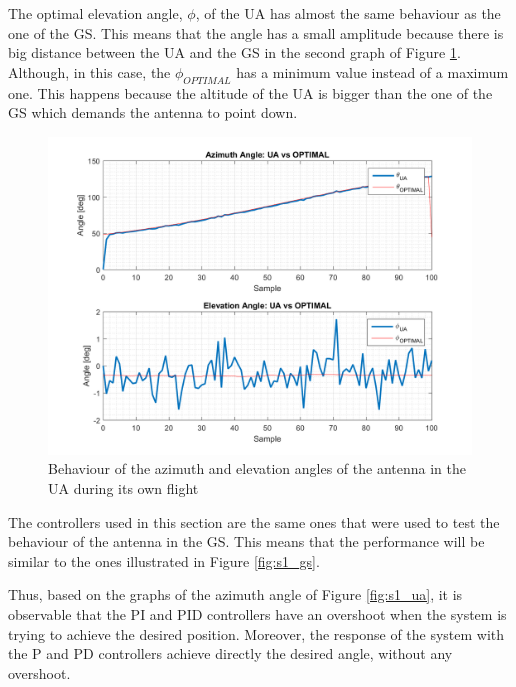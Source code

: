The optimal elevation angle, $\phi$, of the UA has almost the same behaviour as the one of the GS. This means that the angle has a small amplitude because there is big distance between the UA and the GS in the second graph of Figure \ref{fig:s1_pd_ua_alone}. Although, in this case, the $\phi_{OPTIMAL}$ has a minimum value instead of a maximum one. This happens because the altitude of the UA is bigger than the one of the GS which demands the antenna to point down.


\begin{figure}[H]
	\centering
	\includegraphics[scale=0.75]{figures/s1_pd_ua.png}
	\caption{Behaviour of the azimuth and elevation angles of the antenna in the UA during its own flight}
	\label{fig:s1_pd_ua_alone}
\end{figure}

The controllers used in this section are the same ones that were used to test the behaviour of the antenna in the GS. This means that the performance will be similar to the ones illustrated in Figure \ref{fig:s1_gs}.

Thus, based on the graphs of the azimuth angle of Figure \ref{fig:s1_ua}, it is observable that the PI and PID controllers have an overshoot when the system is trying to achieve the desired position. Moreover, the response of the system with the P and PD controllers achieve directly the desired angle, without any overshoot.

